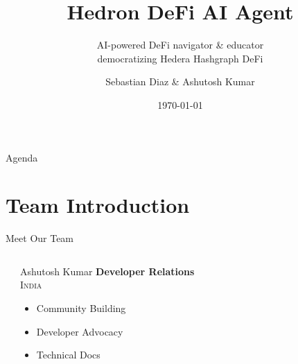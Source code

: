 \documentclass[aspectratio=169]{beamer}
\title{Hedron DeFi AI Agent}
\subtitle{AI-powered DeFi navigator \& educator \\ democratizing Hedera Hashgraph DeFi}
\author{Sebastian Diaz \& Ashutosh Kumar}
\institute{Hello Future Hackathon}
\date{\today}
\begin{document}
\begin{frame}
\titlepage
\end{frame}

\begin{frame}{Agenda}
\tableofcontents
\end{frame}

\section{Team Introduction}

\begin{frame}{Meet Our Team}
\vspace{0.05cm}
\begin{columns}[c]
\begin{center}
\end{center}

\vspace{0.05cm}

\begin{block}{Ashutosh Kumar}
\centering
\vspace{0.05cm}
\textbf{\normalsize \color{secondary}Developer Relations} \\
\vspace{0.05cm}
\textsc{\normalsize India} \\
\vspace{0.05cm}
\begin{itemize}
\setlength\itemsep{0em}
\setlength\leftmargin{1em}
\item Community Building
\item Developer Advocacy  
\item Technical Docs
\end{itemize}
\vspace{0.05cm}
\end{block}


\begin{center}
\end{center}


\end{columns}
\end{frame}
\end{document}
